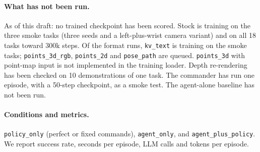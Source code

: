 \paragraph{What has not been run.} As of this draft: no trained checkpoint
has been scored. Stock \dem{} is training on the three smoke tasks (three
seeds and a left-plus-wrist camera variant) and on all 18 tasks toward 300k
steps. Of the format runs, \texttt{kv\_text} is training on the smoke tasks;
\texttt{points\_3d\_rgb}, \texttt{points\_2d} and \texttt{pose\_path} are
queued. \texttt{points\_3d} with point-map input is not implemented in the
training loader. Depth re-rendering has been checked on 10 demonstrations of
one task. The commander has run one episode, with a 50-step checkpoint, as a
smoke test. The agent-alone baseline has not been run.

\paragraph{Conditions and metrics.} \texttt{policy\_only} (perfect or fixed
commands), \texttt{agent\_only}, and \texttt{agent\_plus\_policy}. We report
success rate, seconds per episode, LLM calls and tokens per episode.
